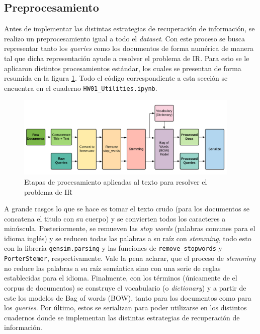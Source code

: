 \subsection*{Preprocesamiento}

Antes de implementar las distintas estrategias de recuperación de información, se realizo un preprocesamiento igual a todo el \textit{dataset}. Con este proceso se busca representar tanto los \textit{queries} como los documentos de forma numérica de manera tal que dicha representación ayude a resolver el problema de IR. Para esto se le aplicaron distintos procesamientos estándar, los cuales se presentan de forma resumida en la figura \ref{fig:preprocess}. Todo el código correspondiente a esta sección se encuentra en el cuaderno \texttt{HW01\_Utilities.ipynb}.

\begin{figure}[H]
    \centering
    \includegraphics[width=0.95\textwidth]{doc/images/preprocesamiento.png}
    \caption{Etapas de procesamiento aplicadas al texto para resolver el problema de IR}
    \label{fig:preprocess}
\end{figure}

A grande rasgos lo que se hace es tomar el texto crudo (para los documentos se concatena el titulo con su cuerpo) y se convierten todos los caracteres a minúscula. Posteriormente, se remueven las \textit{stop words} (palabras comunes para el idioma inglés) y se reducen todas las palabras a su raíz con \textit{stemming}, todo esto con la librería \texttt{gensim.parsing} y las funciones de \texttt{remove\_stopwords} y \texttt{PorterStemer}, respectivamente. Vale la pena aclarar, que el proceso de \textit{stemming} no reduce las palabras a su raíz semántica sino con una serie de reglas establecidas para el idioma. Finalmente, con los términos (únicamente de el corpus de documentos) se construye el vocabulario (o \textit{dictionary}) y a partir de este los modelos de Bag of words (BOW), tanto para los documentos como para los \textit{queries}. Por último, estos se serializan para poder utilizarse en los distintos cuadernos donde se implementan las distintas estrategias de recuperación de información.

